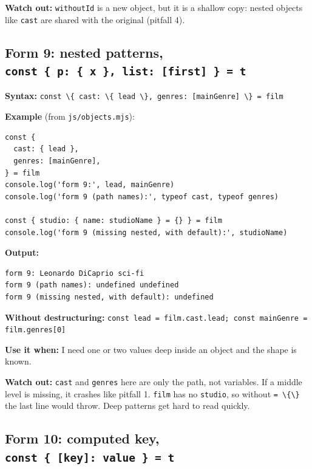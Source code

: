 \documentclass[
]{article}
\newcommand{\passthrough}[1]{#1}
\begin{document}
\textbf{Watch out:} \passthrough{\lstinline!withoutId!} is a new object,
but it is a shallow copy: nested objects like
\passthrough{\lstinline!cast!} are shared with the original (pitfall 4).

\hypertarget{form-9-nested-patterns-const-p-x-list-first-t}{%
\subsection{\texorpdfstring{Form 9: nested patterns,
\texttt{const\ \{\ p:\ \{\ x\ \},\ list:\ {[}first{]}\ \}\ =\ t}}{Form 9: nested patterns, const \{ p: \{ x \}, list: {[}first{]} \} = t}}\label{form-9-nested-patterns-const-p-x-list-first-t}}

\textbf{Syntax:}
\passthrough{\lstinline!const \{ cast: \{ lead \}, genres: [mainGenre] \} = film!}

\textbf{Example} (from \passthrough{\lstinline!js/objects.mjs!}):

\begin{lstlisting}
const {
  cast: { lead },
  genres: [mainGenre],
} = film
console.log('form 9:', lead, mainGenre)
console.log('form 9 (path names):', typeof cast, typeof genres)

const { studio: { name: studioName } = {} } = film
console.log('form 9 (missing nested, with default):', studioName)
\end{lstlisting}

\textbf{Output:}

\begin{lstlisting}
form 9: Leonardo DiCaprio sci-fi
form 9 (path names): undefined undefined
form 9 (missing nested, with default): undefined
\end{lstlisting}

\textbf{Without destructuring:}
\passthrough{\lstinline!const lead = film.cast.lead; const mainGenre = film.genres[0]!}

\textbf{Use it when:} I need one or two values deep inside an object and
the shape is known.

\textbf{Watch out:} \passthrough{\lstinline!cast!} and
\passthrough{\lstinline!genres!} here are only the path, not variables.
If a middle level is missing, it crashes like pitfall 1.
\passthrough{\lstinline!film!} has no \passthrough{\lstinline!studio!},
so without \passthrough{\lstinline!= \{\}!} the last line would throw.
Deep patterns get hard to read quickly.

\hypertarget{form-10-computed-key-const-key-value-t}{%
\subsection{\texorpdfstring{Form 10: computed key,
\texttt{const\ \{\ {[}key{]}:\ value\ \}\ =\ t}}{Form 10: computed key, const \{ {[}key{]}: value \} = t}}\label{form-10-computed-key-const-key-value-t}}
\end{document}
